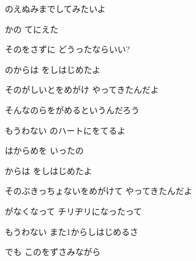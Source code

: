 \documentclass[14pt]{ltjsarticle}
\begin{document}
{  のえぬみまでしてみたいよ
  \jisho{}

  かの てにえた
  \jisho{}

  そのをさずに どうったならいい?
  \jisho{}

\item
  のからは をしはじめたよ
  \jisho{}

  そのがしいとをめがけ やってきたんだよ
  \jisho{}

\item
  そんなのらをがめるというんだろう
  \jisho{}

  もうわない のハートにをてるよ
  \jisho{}

  はからめを いったの
  \jisho{}

\item
  からは をしはじめたよ
  \jisho{}

  そのぶきっちょないをめがけて やってきたんだよ
  \jisho{}

\item
  がなくなって チリヂリになったって
  \jisho{}

  もうわない また1からしはじめるさ
  \jisho{}

  でも このをずさみながら
  \jisho{}

}
\end{document}
